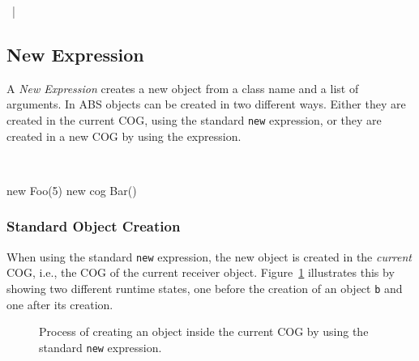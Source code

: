 \begin{abssyntax}
     {}
         ~|~ \\
  {}
           {}
           {}
           {}
\end{abssyntax}

\subsection{New Expression}
A \emph{New Expression} creates a new object from a class name and a list of arguments. In ABS objects can be created in two different ways.
Either they are created in the current COG, using the standard \verb_new_ expression,
or they are created in a new COG by using the  expression.

\begin{abssyntax}
  {}\ \ \ \TRS{(}  \TRS{)}  
\end{abssyntax}

\begin{absexample}
new Foo(5)
new cog Bar()
\end{absexample}

\subsubsection{Standard Object Creation}
When using the standard \verb_new_ expression, the new object is created in the \emph{current} COG, i.e., the COG of the current receiver object.
Figure~\ref{fig:newExpr} illustrates this by showing two different runtime states, one before the creation of an object \verb_b_ and one after its creation.

\begin{figure}
\centering
{}
\caption{Process of creating an object inside the current COG by using the standard \texttt{new} expression.}
\label{fig:newExpr}
\end{figure}

